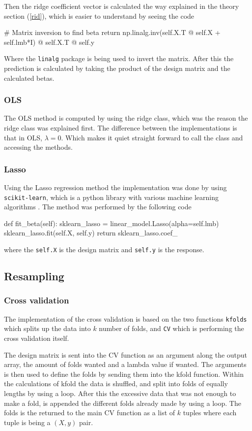 \documentclass[../main.tex]{subfiles}
\begin{document}
Then the ridge coefficient vector is calculated the way explained in the theory section (\ref{rid}), which is easier to understand by seeing the code
\begin{python}
        # Matrix inversion to find beta
        return np.linalg.inv(self.X.T @ self.X + self.lmb*I) @ self.X.T @ self.y
\end{python}
Where the \verb|linalg| package is being used to invert the matrix. After this the prediction is calculated by taking the product of the design matrix and the calculated betas.

\subsubsection{OLS}
The OLS method is computed by using the ridge class, which was the reason the ridge class was explained first. The difference between the implementations is that in OLS, $\lambda=0$. Which makes it quiet straight forward to call the class and accessing the methods.

\subsubsection{Lasso}
Using the Lasso regression method the implementation was done by using \verb|scikit-learn|, which is a python library with various machine learning algorithms \cite{scikitlearn}. The method was performed by the following code
\begin{python}
    def fit_beta(self):
        sklearn_lasso = linear_model.Lasso(alpha=self.lmb)
        sklearn_lasso.fit(self.X, self.y)
        return sklearn_lasso.coef_
\end{python}
where the \verb|self.X| is the design matrix and \verb|self.y| is the response.

\subsection{Resampling}
\subsubsection{Cross validation}
The implementation of the cross validation is based on the two functions \verb|kfolds| which splits up the data into $k$ number of folds, and \verb|CV| which is performing the cross validation itself.

The design matrix is sent into the CV function as an argument along the output array, the amount of folds wanted and a lambda value if wanted. The arguments is then used to define the folds by sending them into the kfold function. Within the calculations of kfold the data is shuffled, and split into folds of equally lengths by using a loop. After this the excessive data that was not enough to make a fold, is appended the different folds already made by using a loop. The folds is the returned to the main CV function as a list of $k$ tuples where each tuple is being a $(X, y)$ pair.
\end{document}
